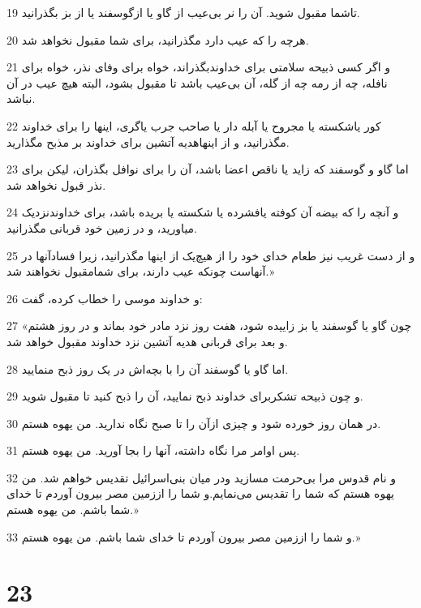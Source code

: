 \par 19 تاشما مقبول شوید. آن را نر بی‌عیب از گاو یا ازگوسفند یا از بز بگذرانید.
\par 20 هر‌چه را که عیب دارد مگذرانید، برای شما مقبول نخواهد شد.
\par 21 و اگر کسی ذبیحه سلامتی برای خداوندبگذراند، خواه برای وفای نذر، خواه برای نافله، چه از رمه چه از گله، آن بی‌عیب باشد تا مقبول بشود، البته هیچ عیب در آن نباشد.
\par 22 کور یاشکسته یا مجروح یا آبله دار یا صاحب جرب یاگری، اینها را برای خداوند مگذرانید، و از اینهاهدیه آتشین برای خداوند بر مذبح مگذارید.
\par 23 اما گاو و گوسفند که زاید یا ناقص اعضا باشد، آن را برای نوافل بگذران، لیکن برای نذر قبول نخواهد شد.
\par 24 و آنچه را که بیضه آن کوفته یافشرده یا شکسته یا بریده باشد، برای خداوندنزدیک میاورید، و در زمین خود قربانی مگذرانید.
\par 25 و از دست غریب نیز طعام خدای خود را از هیچ‌یک از اینها مگذرانید، زیرا فسادآنها در آنهاست چونکه عیب دارند، برای شمامقبول نخواهند شد.»
\par 26 و خداوند موسی را خطاب کرده، گفت:
\par 27 «چون گاو یا گوسفند یا بز زاییده شود، هفت روز نزد مادر خود بماند و در روز هشتم و بعد برای قربانی هدیه آتشین نزد خداوند مقبول خواهد شد.
\par 28 اما گاو یا گوسفند آن را با بچه‌اش در یک روز ذبح منمایید.
\par 29 و چون ذبیحه تشکربرای خداوند ذبح نمایید، آن را ذبح کنید تا مقبول شوید.
\par 30 در همان روز خورده شود و چیزی ازآن را تا صبح نگاه ندارید. من یهوه هستم.
\par 31 پس اوامر مرا نگاه داشته، آنها را بجا آورید. من یهوه هستم.
\par 32 و نام قدوس مرا بی‌حرمت مسازید ودر میان بنی‌اسرائیل تقدیس خواهم شد. من یهوه هستم که شما را تقدیس می‌نمایم.و شما را اززمین مصر بیرون آوردم تا خدای شما باشم. من یهوه هستم.»
\par 33 و شما را اززمین مصر بیرون آوردم تا خدای شما باشم. من یهوه هستم.»
 
\chapter{23}

